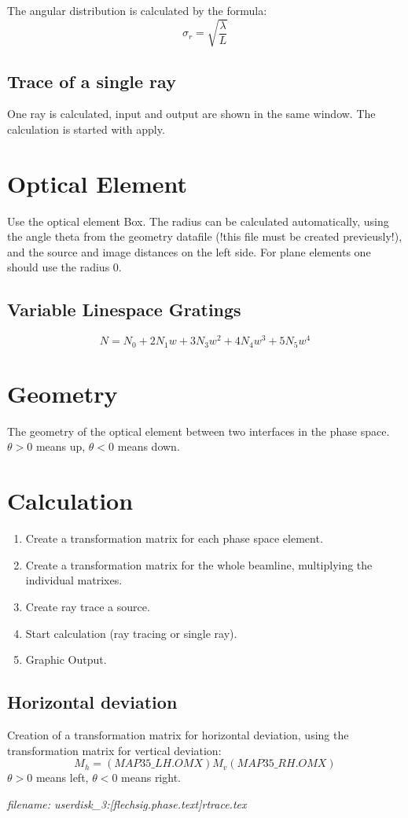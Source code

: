 The angular distribution is calculated by the formula:
\[ \sigma_r= \sqrt{\frac{\lambda}{L}} \]

\subsection {Trace of a single ray}
One ray is calculated, input and output are shown in the same window. The
calculation is started with apply.

\section {Optical Element} 
Use the optical element Box. The radius can be calculated automatically, using
the angle theta from the geometry datafile (!this file must be created
previeusly!), and the source and image distances on the left side. For plane
elements one should use the radius 0. 

\subsection {Variable Linespace Gratings}
\[ N = N_0 + 2 N_1 w + 3 N_3 w^2 + 4 N_4 w^3 + 5 N_5 w^4 \]
 
\section {Geometry} 
The geometry of the optical element between two interfaces in the phase space.
$\theta > 0$ means up, $\theta < 0$ means down.


\section {Calculation}
\begin {enumerate} 
\item Create a transformation matrix for each phase space element.
\item Create a transformation matrix for the whole beamline, multiplying the
individual matrixes.
\item Create ray trace a source.
\item Start calculation (ray tracing or single ray).
\item Graphic Output.
\end {enumerate} 

\subsection {Horizontal deviation}
Creation of a transformation matrix for horizontal deviation, using the
transformation matrix for vertical deviation:
\[ M_h= (MAP35\_LH.OMX) M_v (MAP35\_RH.OMX)  \]
$\theta > 0$ means left, $\theta < 0$ means right.
 



\tiny{\it filename: userdisk\_3:[flechsig.phase.text]rtrace.tex}     

